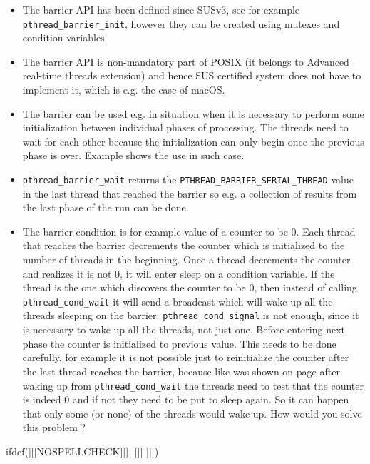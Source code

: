 \begin{itemize}
\item The barrier API has been defined since SUSv3, see for example
\texttt{pthread\_\-barrier\_init}, however they can be created using
mutexes and condition variables.
\item The barrier API is non-mandatory part of POSIX (it belongs to
Advanced real-time threads extension) and hence SUS certified system does not
have to implement it, which is e.g. the case of macOS.
\item The barrier can be used e.g. in situation when it is necessary to perform
some initialization between individual phases of processing. The threads
need to wait for each other because the initialization can only begin
once the previous phase is over.
Example  shows the use in such case.
\item \texttt{pthread\_barrier\_wait} returns
the \texttt{PTHREAD\_BARRIER\_SERIAL\_THREAD} value
in the last thread that reached the barrier so e.g. a collection of
results from the last phase of the run can be done.
\item The barrier condition is for example value of a counter to be 0.
Each thread that reaches the barrier decrements the counter which is
initialized to the number of threads in the beginning.
Once a thread decrements the counter and realizes it is not 0,
it will enter sleep on a condition variable.
If the thread is the one which discovers the counter to be 0, then instead of
calling \texttt{pthread\_cond\_wait} it will send a broadcast which will
wake up all the threads sleeping on the barrier.
\texttt{pthread\_cond\_signal} is not enough, since it is necessary to wake up
all the threads, not just one.
Before entering next phase the counter is initialized to previous value.
This needs to be done carefully, for example it is not possible just to
reinitialize the counter after the last thread reaches the barrier,
because like was shown on page \pageref{CONDITION_VARIABLES} after waking
up from \texttt{pthread\_cond\_wait} the threads need to test that the counter
is indeed 0 and if not they need to be put to sleep again. So it can happen
that only some (or none) of the threads would wake up.
How would you solve this problem ?
\end{itemize}



ifdef([[[NOSPELLCHECK]]], [[[
]]])

